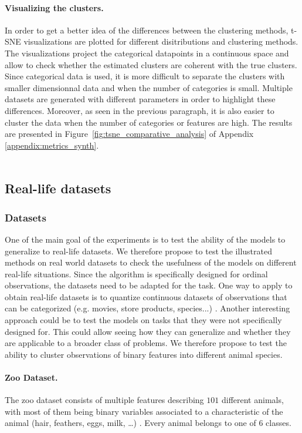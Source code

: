\paragraph{Visualizing the clusters.}
In order to get a better idea of the differences between the clustering methods, t-SNE visualizations \citep{van2008visualizing} are plotted for different disitributions and clustering methods. The visualizations project the categorical datapoints in a continuous space and allow to check whether the estimated clusters are coherent with the true clusters. Since categorical data is used, it is more difficult to separate the clusters with smaller dimensionnal data and when the number of categories is small. Multiple datasets are generated with different parameters in order to highlight these differences. Moreover, as seen in the previous paragraph, it is also easier to cluster the data when the number of categories or features are high.
The results are presented in Figure~\ref{fig:tsne_comparative_analysis} of Appendix \ref{appendix:metrics_synth}. \\ \\

\subsection{Real-life datasets}
\subsubsection{Datasets} One of the main goal of the experiments is to test the ability of the models to generalize to real-life datasets. We therefore propose to test the illustrated methods on real world datasets to check the usefulness of the models on different real-life situations. Since the algorithm is specifically designed for ordinal observations, the datasets need to be adapted for the task. One way to apply to obtain real-life datasets is to quantize continuous datasets of observations that can be categorized (e.g. movies, store products, species...) \citep{skubacz2000quantization}. Another interesting approach could be to test the models on tasks that they were not specifically designed for. This could allow seeing how they can generalize and whether they are applicable to a broader class of problems. We therefore propose to test the ability to cluster observations of binary features into different animal species.
\paragraph{Zoo Dataset.} The zoo dataset consists of multiple features describing $101$ different animals, with most of them being binary variables associated to a characteristic of the animal (hair, feathers, eggs, milk, \ldots) \citep{misc_zoo_111}. Every animal belongs to one of $6$ classes. 
